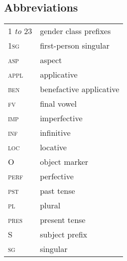 \documentclass[output=paper]{langsci/langscibook}
\begin{document}
\subsection*{Abbreviations}
\begin{tabular}{ll}
 1 \emph{to} 23 &  gender class prefixes\\
 1{\scshape sg} &  first-person singular\\
 {\scshape asp} & aspect\\
 {\scshape appl} & applicative\\
 {\scshape ben}  & benefactive applicative\\
 {\scshape fv} & final vowel\\
 {\scshape imp} &  imperfective\\
 {\scshape inf} &  infinitive\\
 {\scshape loc} &  locative\\
  {\scshape O} &  object marker\\
  {\scshape perf} &  perfective\\
  {\scshape pst} &  past tense\\
  {\scshape pl} & plural\\
  {\scshape pres} & present tense\\
  S  & subject prefix\\
  {\scshape sg} & singular\\
\end{tabular}
% 


\printbibliography[heading=subbibliography,notkeyword=this]
\end{document}
